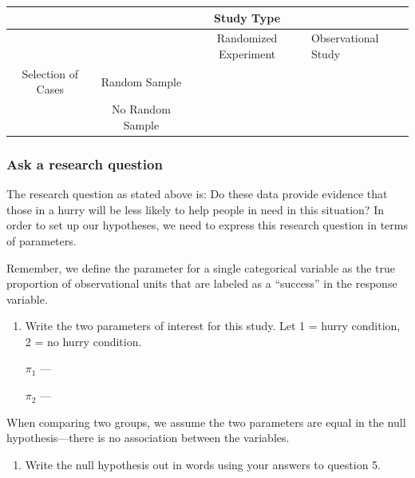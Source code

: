 \documentclass[
]{report}
\providecommand{\tightlist}{%
  \setlength{\itemsep}{0pt}\setlength{\parskip}{0pt}}
\begin{document}
\begin{longtable}[]{@{}cccl@{}}
\toprule
& & Study Type & \\
\midrule
\endhead
& & Randomized Experiment & Observational Study \\
Selection of Cases & Random Sample & & \\
& No Random Sample & & \\
\bottomrule
\end{longtable}


\hypertarget{ask-a-research-question-1}{%
\subsubsection*{Ask a research question}\label{ask-a-research-question-1}}

The research question as stated above is: Do these data provide evidence that those in a hurry will be less likely to help people in need in this situation? In order to set up our hypotheses, we need to express this research question in terms of parameters.

Remember, we define the parameter for a single categorical variable as the true proportion of observational units that are labeled as a ``success'' in the response variable.

\newpage

\begin{enumerate}
\def\labelenumi{\arabic{enumi}.}
\setcounter{enumi}{4}
\item
  Write the two parameters of interest for this study. Let 1 = hurry condition, 2 = no hurry condition.
  \vspace{1mm}

  \(\pi_1\) ---
  \vspace{0.5in}

  \(\pi_2\) ---
  \vspace{0.5in}
\end{enumerate}

When comparing two groups, we assume the two parameters are equal in the null hypothesis---there is no association between the variables.

\begin{enumerate}
\def\labelenumi{\arabic{enumi}.}
\setcounter{enumi}{5}
\tightlist
\item
  Write the null hypothesis out in words using your answers to question 5.
\end{enumerate}
\end{document}
